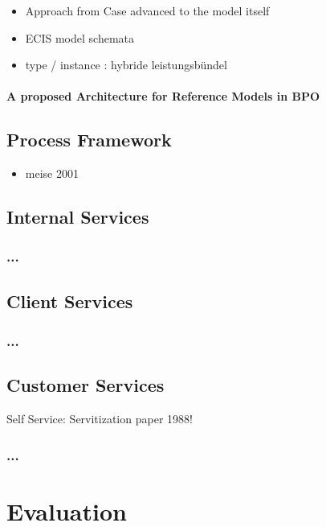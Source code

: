 
\begin{itemize}
	\item Approach from Case advanced to the model itself
	\item ECIS model schemata
	\item type / instance : hybride leistungsbündel
\end{itemize}
\subsubsection{A proposed Architecture for Reference Models in BPO}
	\section{Process Framework}
	\begin{itemize}
		\item meise 2001
	\end{itemize}
	\section{Internal Services}
	\subsection{...}
	\section{Client Services}
	\subsection{...}
	\section{Customer Services}
	Self Service: Servitization paper 1988!
	\subsection{...}
\chapter{Evaluation}